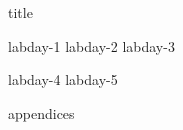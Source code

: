 \documentclass[11pt,titlepage]{report}
\begin{document}
{title}

\clearpage
\tableofcontents

\clearpage
{}
{labday-1}
{labday-2}
{labday-3}

{labday-4}
{labday-5}

\clearpage
{}
\printbibliography[heading=bibintoc]

\clearpage
{}
{appendices}
\end{document}
